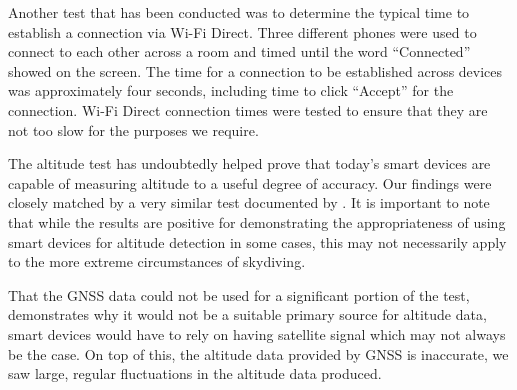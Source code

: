Another test that has been conducted was to determine the typical time to establish a connection via Wi-Fi Direct. Three different phones were used to connect to each other across a room and timed until the word ``Connected'' showed on the screen. The time for a connection to be established across devices was approximately four seconds, including time to click ``Accept'' for the connection. Wi-Fi Direct connection times were tested to ensure that they are not too slow for the purposes we require.

The altitude test has undoubtedly helped prove that today's smart devices are capable of measuring altitude to a useful degree of accuracy. Our findings were closely matched by a very similar test documented by \textcite{he_atmospheric_2012}. It is important to note that while the results are positive for demonstrating the appropriateness of using smart devices for altitude detection in some cases, this may not necessarily apply to the more extreme circumstances of skydiving.

That the GNSS data could not be used for a significant portion of the test, demonstrates why it would not be a suitable primary source for altitude data, smart devices would have to rely on having satellite signal which may not always be the case. On top of this, the altitude data provided by GNSS is inaccurate, we saw large, regular fluctuations in the altitude data produced.
